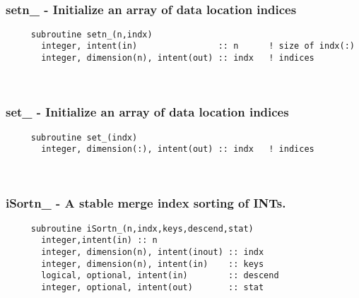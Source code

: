  
\mbox{}\hrulefill\ 
 
  \subsubsection{setn\_ - Initialize an array of data location indices}

\begin{verbatim} 
     subroutine setn_(n,indx)
       integer, intent(in)                :: n		! size of indx(:)
       integer, dimension(n), intent(out) :: indx	! indices
 \end{verbatim} %
 
 
\mbox{}\hrulefill\ 
 
  \subsubsection{set\_ - Initialize an array of data location indices}

\begin{verbatim} 
     subroutine set_(indx)
       integer, dimension(:), intent(out) :: indx	! indices
 \end{verbatim} %
 
 
\mbox{}\hrulefill\ 
 

  \subsubsection{iSortn\_ - A stable merge index sorting of INTs.}

\begin{verbatim} 
     subroutine iSortn_(n,indx,keys,descend,stat)
       integer,intent(in) :: n
       integer, dimension(n), intent(inout) :: indx
       integer, dimension(n), intent(in)    :: keys
       logical, optional, intent(in)        :: descend
       integer, optional, intent(out)       :: stat
 \end{verbatim} %
 
